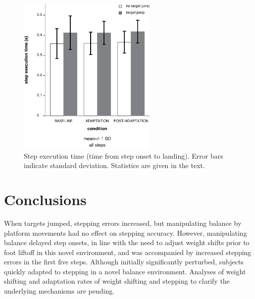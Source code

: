 \begin{figure}[!ht]
	\centering
	\includegraphics[width=0.6\textwidth]{"Zrinka/step exec time-all steps"}
	\caption{Step execution time (time from step onset to landing). Error bars indicate standard deviation. Statistics are given in the text.}
	\label{fig:stepExecTimeAll}
\end{figure}

\section{Conclusions}
When targets jumped, stepping errors increased, but manipulating balance by platform movements had no effect on stepping accuracy. However, manipulating balance delayed step onsets, in line with the need to adjust weight shifts prior to foot liftoff in this novel environment, and was accompanied by increased stepping errors in the first five steps. Although initially significantly perturbed, subjects quickly adapted to stepping in a novel balance environment. Analyses of weight shifting and adaptation rates of weight shifting and stepping to clarify the underlying mechanisms are pending.